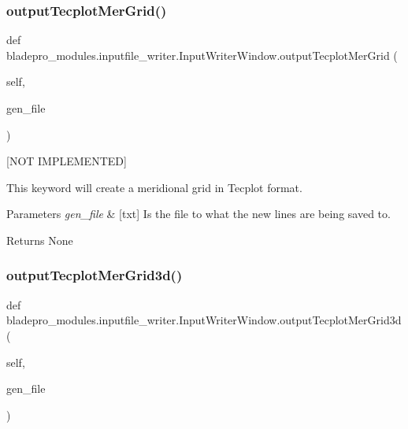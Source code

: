 \subsubsection{\texorpdfstring{output\+Tecplot\+Mer\+Grid()}{outputTecplotMerGrid()}}
{\footnotesize\ttfamily def bladepro\+\_\+modules.\+inputfile\+\_\+writer.\+Input\+Writer\+Window.\+output\+Tecplot\+Mer\+Grid (\begin{DoxyParamCaption}\item[{}]{self,  }\item[{}]{gen\+\_\+file }\end{DoxyParamCaption})}



\mbox{[}N\+OT I\+M\+P\+L\+E\+M\+E\+N\+T\+ED\mbox{]} 

This keyword will create a meridional grid in Tecplot format.


\begin{DoxyParams}{Parameters}
{\em gen\+\_\+file} & \mbox{[}txt\mbox{]} Is the file to what the new lines are being saved to. \\
\hline
\end{DoxyParams}
\begin{DoxyReturn}{Returns}
None 
\end{DoxyReturn}
\hypertarget{classbladepro__modules_1_1inputfile__writer_1_1_input_writer_window_a4ea4c17b862c49ad9c51398fa9d60dbc}{}\label{classbladepro__modules_1_1inputfile__writer_1_1_input_writer_window_a4ea4c17b862c49ad9c51398fa9d60dbc} 
\subsubsection{\texorpdfstring{output\+Tecplot\+Mer\+Grid3d()}{outputTecplotMerGrid3d()}}
{\footnotesize\ttfamily def bladepro\+\_\+modules.\+inputfile\+\_\+writer.\+Input\+Writer\+Window.\+output\+Tecplot\+Mer\+Grid3d (\begin{DoxyParamCaption}\item[{}]{self,  }\item[{}]{gen\+\_\+file }\end{DoxyParamCaption})}



